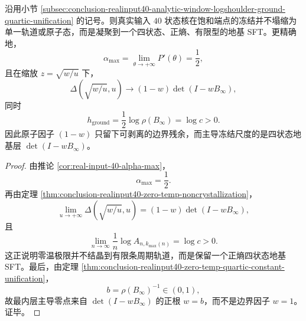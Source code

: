 \begin{corollary}[非原子冻结的正熵凝聚]\label{cor:conclusion-realinput40-nonatomic-freezing-positive-entropy}
沿用小节 \ref{subsec:conclusion-realinput40-analytic-window-logshoulder-ground-quartic-unification} 的记号。则真实输入 \(40\) 状态核在饱和端点的冻结并不塌缩为单一轨道或原子态，而是凝聚到一个四状态、正熵、有限型的地基 SFT。更精确地，
\[
\alpha_{\max}=\lim_{\theta\to+\infty}P'(\theta)=\frac12,
\]
且在缩放 \(z=\sqrt{w/u}\) 下，
\[
\Delta\!\left(\sqrt{w/u},u\right)\longrightarrow (1-w)\det(I-wB_\infty),
\]
同时
\[
h_{\mathrm{ground}}=\frac12\log\rho(B_\infty)=\log c>0.
\]
因此原子因子 \((1-w)\) 只留下可剥离的边界残余，而主导冻结尺度的是四状态地基层 \(\det(I-wB_\infty)\)。
\end{corollary}
\begin{proof}
由推论 \ref{cor:real-input-40-alpha-max}，
\[
\alpha_{\max}=\frac12.
\]
再由定理 \ref{thm:conclusion-realinput40-zero-temp-noncrystallization}，
\[
\lim_{u\to+\infty}\Delta\!\left(\sqrt{w/u},u\right)
=(1-w)\det(I-wB_\infty),
\]
且
\[
\lim_{n\to\infty}\frac1n\log A_{n,k_{\max}(n)}=\log c>0.
\]
这正说明零温极限并不结晶到有限条周期轨道，而是保留一个正熵四状态地基 SFT。最后，由定理 \ref{thm:conclusion-realinput40-zero-temp-quartic-constant-unification}，
\[
b=\rho(B_\infty)^{-1}\in(0,1),
\]
故最内层主导零点来自 \(\det(I-wB_\infty)\) 的正根 \(w=b\)，而不是边界因子 \(w=1\)。证毕。
\end{proof}

